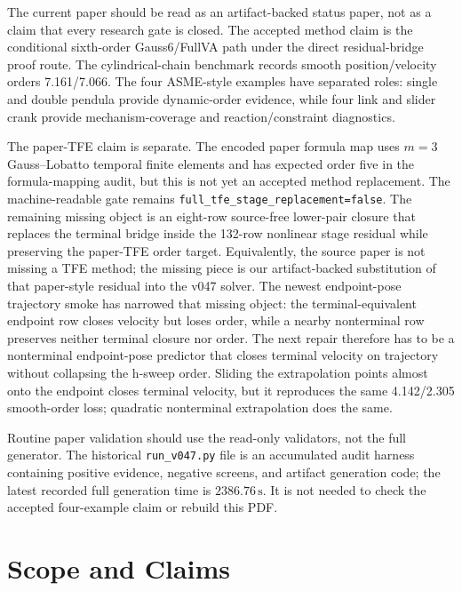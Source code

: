 \documentclass[11pt]{article}
\newcommand{\method}{Gauss6/FullVA}
\newcommand{\tfe}{TFE}
\newcommand{\artifact}[1]{\texttt{#1}}
\begin{document}
The current paper should be read as an artifact-backed status paper, not as a
claim that every research gate is closed.  The accepted method claim is the
conditional sixth-order \method{} path under the direct residual-bridge proof
route.  The cylindrical-chain benchmark records smooth position/velocity
orders 7.161/7.066.  The four ASME-style examples have separated roles:
single and double pendula provide dynamic-order evidence, while four link and
slider crank provide mechanism-coverage and reaction/constraint diagnostics.

The paper-\tfe{} claim is separate.  The encoded paper formula map uses
$m=3$ Gauss--Lobatto temporal finite elements and has expected order five in
the formula-mapping audit, but this is not yet an accepted method replacement.
The machine-readable gate remains
\nolinkurl{full_tfe_stage_replacement=false}.  The remaining missing object is
an eight-row source-free lower-pair closure that replaces the terminal bridge
inside the 132-row nonlinear stage residual while preserving the paper-\tfe{}
order target.
Equivalently, the source paper is not missing a \tfe{} method; the missing
piece is our artifact-backed substitution of that paper-style residual into
the v047 solver.
The newest endpoint-pose trajectory smoke has narrowed that missing object:
the terminal-equivalent endpoint row closes velocity but loses order, while a
nearby nonterminal row preserves neither terminal closure nor order.  The next
repair therefore has to be a nonterminal endpoint-pose predictor that closes
terminal velocity on trajectory without collapsing the h-sweep order.  Sliding
the extrapolation points almost onto the endpoint closes terminal velocity, but
it reproduces the same 4.142/2.305 smooth-order loss; quadratic nonterminal
extrapolation does the same.

Routine paper validation should use the read-only validators, not the full
generator.  The historical \artifact{run\_v047.py} file is an accumulated
audit harness containing positive evidence, negative screens, and artifact
generation code; the latest recorded full generation time is
$2386.76\,\mathrm{s}$.  It is not needed to check the accepted four-example
claim or rebuild this PDF.

\section{Scope and Claims}
\end{document}
